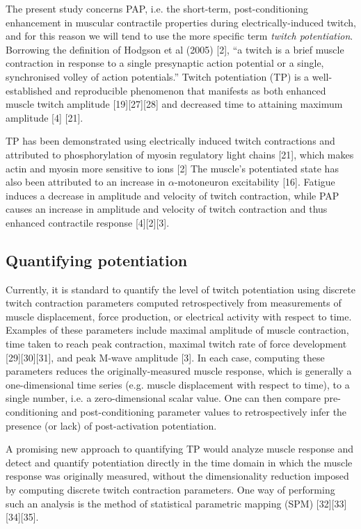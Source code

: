 \documentclass[utf8]{style/FrontiersinHarvard}
\begin{document}
The present study concerns PAP, i.e. the short-term, post-conditioning enhancement in muscular contractile properties during electrically-induced twitch, and for this reason we will tend to use the more specific term \textit{twitch potentiation}.
Borrowing the definition of Hodgson et al (2005) [2],
``a twitch is a brief muscle contraction in response to a single presynaptic action potential or a single, synchronised volley of action potentials.''
Twitch potentiation (TP) is a well-established and reproducible phenomenon that manifests as both enhanced muscle twitch amplitude [19][27][28] and decreased time to attaining maximum amplitude [4] \cite{sale} [21].

TP has been demonstrated using electrically induced twitch contractions and attributed to phosphorylation of myosin regulatory light chains [21], which makes actin and myosin more sensitive to  ions [2]
The muscle's potentiated state has also been attributed to an increase in $ \alpha $-motoneuron excitability [16].
Fatigue induces a decrease in amplitude and velocity of twitch contraction, while PAP causes an increase in amplitude and velocity of twitch contraction and thus enhanced contractile response [4][2][3].

\subsection{Quantifying potentiation}
Currently, it is standard to quantify the level of twitch potentiation using discrete twitch contraction parameters computed retrospectively from measurements of muscle displacement, force production, or electrical activity with respect to time.
Examples of these parameters include maximal amplitude of muscle contraction, time taken to reach peak contraction, maximal twitch rate of force development [29][30][31], and peak M-wave amplitude [3].
In each case, computing these parameters reduces the originally-measured muscle response, which is generally a one-dimensional time series (e.g. muscle displacement with respect to time), to a single number, i.e. a zero-dimensional scalar value.
One can then compare pre-conditioning and post-conditioning parameter values to retrospectively infer the presence (or lack) of post-activation potentiation.

A promising new approach to quantifying TP would analyze 
muscle response and detect and quantify potentiation directly in the time domain in which the muscle response was originally measured, without the dimensionality reduction imposed by computing discrete twitch contraction parameters.
One way of performing such an analysis is the method of statistical parametric mapping (SPM) [32][33][34][35].
\end{document}
